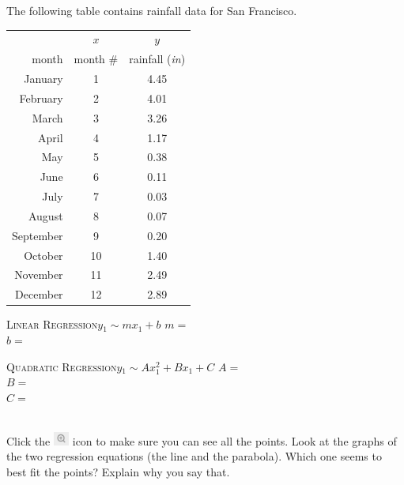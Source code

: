 \documentclass[12pt,letterpaper]{memoir}
\begin{document}
\myWideProblemWithContent 
{
    The following table contains rainfall data 
    for San Francisco.\\[0.5em]
    \begin{minipage}{0.35\textwidth}
        \footnotesize
        \begin{tabular}{rcc}
            &$x$ & $y$ \\ 
            \cmidrule{2-2} \cmidrule{3-3}
            month & month \# & rainfall ({\itshape in}) \\
            \midrule 
            January  &1 & 4.45 \\
            February  &2& 4.01 \\ 
            March  &3& 3.26 \\ 
            April  &4& 1.17 \\ 
            May  &5& 0.38 \\ 
            June  &6& 0.11 \\ 
            July  &7& 0.03 \\ 
            August  &8& 0.07 \\ 
            September  &9& 0.20 \\
            October  &10& 1.40 \\
            November &11& 2.49 \\ 
            December &12& 2.89 \\
            \bottomrule
        \end{tabular}
        \end{minipage}
    \begin{minipage}{0.64\textwidth}
        \begin{tcolorbox}[colback=white,width=\textwidth]
            \small
            \scshape{Linear Regression}\hfill$y_1 \sim m x_1 + b$
            \tcblower
            $m =$  \\
            $b =$ 
        \end{tcolorbox}
        \begin{tcolorbox}[colback=white,width=\textwidth]
            \small
            \scshape{Quadratic Regression}\hfill$y_1 \sim A x_1^2 + B x_1 + C$
            \tcblower
            $A =$  \\
            $B =$ \\
            $C =$ 
        \end{tcolorbox}
    \end{minipage}\\[1\onelineskip]
    Click the 
    \includegraphics[width=0.2in]{magnifying-glass-plus.png} 
    icon to make sure you can see all the points.
    Look at the graphs of the two regression equations 
    (the line and the parabola).
    Which one seems to best fit the points?
    Explain why you say that.
    \vspace{0.7in}
}
\end{document}
